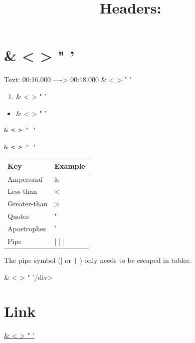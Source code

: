 \documentclass[11pt,a4paper]{article}
\title{Headers:}
\begin{document}
\maketitle

\section{\& < > " '}

Text: 00:16.000 ----> 00:18.000 \& < > " '

\begin{enumerate}
\item \& < > " '
\end{enumerate}

\begin{itemize}
\item \& < > " '
\end{itemize}

\begin{verbatim}
& < > " '
\end{verbatim}

\begin{verbatim}
& < > " '
\end{verbatim}

\begin{table}[h]
\begin{tabular}{|l|l|}
\hline
Key & Example \\ \hline
Ampersand & \& \\ \hline
Less-than & < \\ \hline
Greater-than & > \\ \hline
Quotes & " \\ \hline
Apostrophes & ' \\ \hline
Pipe & | | | \\ \hline
\end{tabular}
\end{table}

The pipe symbol (| or \texttt{|} ) only needs to be escaped in tables.

\& < > " '/div>

\section{Link}

\href{https://en.wikipedia.org/wiki/Albert\_Einstein}{\& < > " '}
\end{document}
